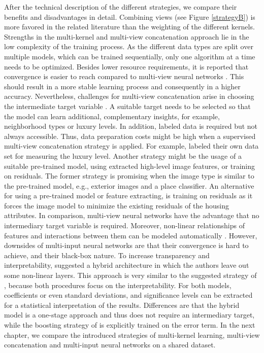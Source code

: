 \documentclass[letterpaper]{article} %
\begin{document}
After the technical description of the different strategies, we compare their benefits and disadvantages in detail. Combining views (see Figure \ref{strategyB}) is more favored in the related literature than the weighting of the different kernels. Strengths in the multi-kernel and multi-view concatenation approach lie in the low complexity of the training process. As the different data types are split over multiple models, which can be trained sequentially, only one algorithm at a time needs to be optimized. Besides lower resource requirements, it is reported that convergence is easier to reach compared to multi-view neural networks \cite{bency2017beyond}. This should result in a more stable learning process and consequently in a higher accuracy. Nevertheless, challenges for multi-view concatenation arise in choosing the intermediate target variable \cite{law2019take}. A suitable target needs to be selected so that the model can learn additional, complementary insights, for example, neighborhood types or luxury levels. In addition, labeled data is required but not always accessible. Thus, data preparation costs might be high when a supervised multi-view concatenation strategy is applied. For example, \citeauthor{poursaeed2018vision} \citeyearpar{poursaeed2018vision} labeled their own data set for measuring the luxury level. Another strategy might be the usage of a suitable pre-trained model, using extracted high-level image features, or training on residuals. The former strategy is promising when the image type is similar to the pre-trained model, e.g., exterior images and a place classifier. An alternative for using a pre-trained model or feature extracting, is training on residuals as it forces the image model to minimize the existing residuals of the housing attributes. In comparison, multi-view neural networks have the advantage that no intermediary target variable is required. Moreover, non-linear relationships of features and interactions between them can be modeled automatically \cite{law2019take}. However, downsides of multi-input neural networks are that their convergence is hard to achieve, and their black-box nature. To increase transparency and interpretability, \citeauthor{law2019take} suggested a hybrid architecture in which the authors leave out some non-linear layers. This approach is very similar to the suggested strategy of \citeauthor{naumzik2020one} \citeyearpar{naumzik2020one}, because both procedures focus on the interpretability. For both models, coefficients or even standard deviations, and significance levels can be extracted for a statistical interpretation of the results. Differences are that the hybrid model is a one-stage approach and thus does not require an intermediary target, while the boosting strategy of \citeauthor{naumzik2020one} is explicitly trained on the error term. In the next chapter, we compare the introduced strategies of multi-kernel learning, multi-view concatenation and multi-input neural networks on a shared dataset.
\end{document}
